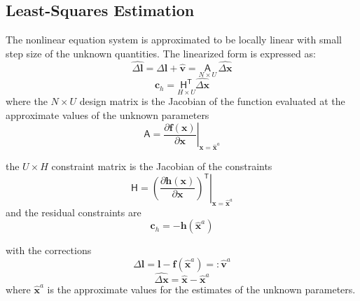 \subsection{Least-Squares Estimation}
\label{subsec:LSadj}

The nonlinear equation system is approximated to be locally linear with small step size of the unknown quantities. The linearized form is expressed as:
\begin{equation} \label{eq:GM-ObsEq-linear}
\widehat{\Delta\boldsymbol l}=\Delta\boldsymbol l+\widehat{\boldsymbol v}=\underset{N\times U}{\mathsf{A}}\,\widehat{\Delta\boldsymbol x}
\end{equation}
\begin{equation} \label{eq:GM-ConEq-linear}
\boldsymbol c_h=\underset{H\times U}{\mathsf{H^T}}\widehat{\Delta\boldsymbol x}
\end{equation}
where\newline
the $N\times U$ design matrix is the Jacobian of the function evaluated at the approximate values of the unknown parameters
\begin{equation*}
\mathsf{A}=\left.\dfrac{\partial\boldsymbol f(\boldsymbol x)}{\partial\boldsymbol x}\right|_{\boldsymbol x=\widehat{\boldsymbol x}^a}
\end{equation*}

the $U\times H$ constraint matrix is the Jacobian of the constraints
\begin{equation*}
\mathsf{H}=\left.\left(\dfrac{\partial\boldsymbol h(\boldsymbol x)}{\partial\boldsymbol x}\right)^\mathsf{T}\right|_{\boldsymbol x=\widehat{\boldsymbol x}^a}
\end{equation*}
and the residual constraints are %
\begin{equation*}
\boldsymbol c_h=-\boldsymbol h(\widehat{\boldsymbol x}^a)
\end{equation*}

with the corrections
\begin{equation} \label{eq:GM-ObsEq-linear-l}
\Delta\boldsymbol l=\boldsymbol l-\boldsymbol f(\widehat{\boldsymbol x}^a)=:\widehat{\boldsymbol v}^a
\end{equation}
\begin{equation} \label{eq:GM-ObsEq-linear-x}
\widehat{\Delta\boldsymbol x}=\widehat{\boldsymbol x}-\widehat{\boldsymbol x}^a
\end{equation}
where $\widehat{\boldsymbol x}^a$ is the approximate values for the estimates of the unknown parameters.

